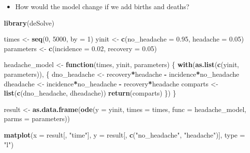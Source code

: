 \documentclass[]{article}
\newenvironment{Shaded}{\begin{snugshade}}{\end{snugshade}}
\newcommand{\KeywordTok}[1]{\textcolor[rgb]{0.13,0.29,0.53}{\textbf{#1}}}
\newcommand{\DataTypeTok}[1]{\textcolor[rgb]{0.13,0.29,0.53}{#1}}
\newcommand{\DecValTok}[1]{\textcolor[rgb]{0.00,0.00,0.81}{#1}}
\newcommand{\FloatTok}[1]{\textcolor[rgb]{0.00,0.00,0.81}{#1}}
\newcommand{\StringTok}[1]{\textcolor[rgb]{0.31,0.60,0.02}{#1}}
\newcommand{\ControlFlowTok}[1]{\textcolor[rgb]{0.13,0.29,0.53}{\textbf{#1}}}
\newcommand{\OperatorTok}[1]{\textcolor[rgb]{0.81,0.36,0.00}{\textbf{#1}}}
\newcommand{\NormalTok}[1]{#1}
\providecommand{\tightlist}{%
  \setlength{\itemsep}{0pt}\setlength{\parskip}{0pt}}
\begin{document}
\begin{itemize}
\tightlist
\item
  How would the model change if we add births and deaths?
\end{itemize}

\begin{Shaded}
\begin{Highlighting}[]
\KeywordTok{library}\NormalTok{(deSolve)}

\NormalTok{times <-}\StringTok{ }\KeywordTok{seq}\NormalTok{(}\DecValTok{0}\NormalTok{, }\DecValTok{5000}\NormalTok{, }\DataTypeTok{by =} \DecValTok{1}\NormalTok{)}
\NormalTok{yinit <-}\StringTok{ }\KeywordTok{c}\NormalTok{(}\DataTypeTok{no_headache =} \FloatTok{0.95}\NormalTok{, }\DataTypeTok{headache =} \FloatTok{0.05}\NormalTok{)}
\NormalTok{parameters <-}\StringTok{ }\KeywordTok{c}\NormalTok{(}\DataTypeTok{incidence =} \FloatTok{0.02}\NormalTok{, }\DataTypeTok{recovery =} \FloatTok{0.05}\NormalTok{)}

\NormalTok{headache_model <-}\StringTok{ }\ControlFlowTok{function}\NormalTok{(times, yinit, parameters) \{}
    \KeywordTok{with}\NormalTok{(}\KeywordTok{as.list}\NormalTok{(}\KeywordTok{c}\NormalTok{(yinit, parameters)), \{}
\NormalTok{      dno_headache <-}\StringTok{ }\NormalTok{recovery}\OperatorTok{*}\NormalTok{headache }\OperatorTok{-}\StringTok{ }\NormalTok{incidence}\OperatorTok{*}\NormalTok{no_headache}
\NormalTok{      dheadache <-}\StringTok{ }\NormalTok{incidence}\OperatorTok{*}\NormalTok{no_headache }\OperatorTok{-}\StringTok{ }\NormalTok{recovery}\OperatorTok{*}\NormalTok{headache}
\NormalTok{      comparts <-}\StringTok{ }\KeywordTok{list}\NormalTok{(}\KeywordTok{c}\NormalTok{(dno_headache, dheadache))}
      \KeywordTok{return}\NormalTok{(comparts)}
\NormalTok{    \})}
\NormalTok{\}}

\NormalTok{result <-}\StringTok{ }\KeywordTok{as.data.frame}\NormalTok{(}\KeywordTok{ode}\NormalTok{(}\DataTypeTok{y =}\NormalTok{ yinit, }\DataTypeTok{times =}\NormalTok{ times, }
                            \DataTypeTok{func =}\NormalTok{ headache_model, }\DataTypeTok{parms =}\NormalTok{ parameters))}

\KeywordTok{matplot}\NormalTok{(}\DataTypeTok{x =}\NormalTok{ result[, }\StringTok{"time"}\NormalTok{], }
        \DataTypeTok{y =}\NormalTok{ result[, }\KeywordTok{c}\NormalTok{(}\StringTok{"no_headache"}\NormalTok{, }\StringTok{"headache"}\NormalTok{)], }\DataTypeTok{type =} \StringTok{"l"}\NormalTok{)}
\end{Highlighting}
\end{Shaded}
\end{document}
